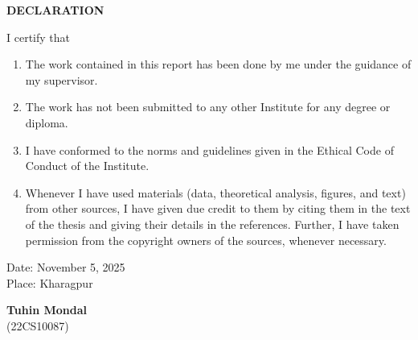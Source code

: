 \begin{center}
    {\Large\textbf{DECLARATION}}\\[0.4in]
\end{center}

I certify that

\begin{enumerate}
    \item The work contained in this report has been done by me under the guidance of my supervisor.
    \item The work has not been submitted to any other Institute for any degree or diploma.
    \item I have conformed to the norms and guidelines given in the Ethical Code of Conduct of the Institute.
    \item Whenever I have used materials (data, theoretical analysis, figures, and text) from other sources, I have given due credit to them by citing them in the text of the thesis and giving their details in the references. Further, I have taken permission from the copyright owners of the sources, whenever necessary.
\end{enumerate}
\vspace{3in}
\noindent
\begin{minipage}[t]{0.48\textwidth}
Date: November 5, 2025 \\
Place: Kharagpur
\end{minipage}\hfill
\begin{minipage}[t]{0.48\textwidth}
\begin{flushright}
\textbf{Tuhin Mondal}\\
(22CS10087)
\end{flushright}
\end{minipage}

\newpage
